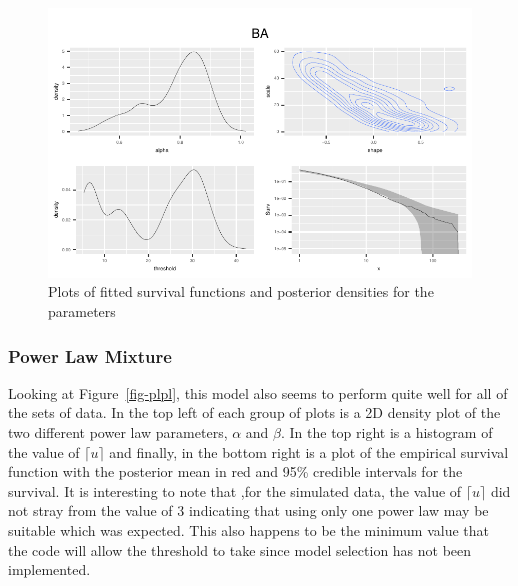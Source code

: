 \documentclass[
]{article}
\begin{document}
\begin{figure}
\begin{minipage}[t]{0.33\linewidth}
{\captionsetup{labelsep=none}\includegraphics{proposal_files/figure-pdf/fig-pli-5.pdf}

}

\subcaption{\label{fig-pli-5}}

\end{minipage}%

\caption{\label{fig-pli}Plots of fitted survival functions and posterior
densities for the parameters}

\end{figure}%

\subsubsection{Power Law Mixture}\label{power-law-mixture}

Looking at Figure~\ref{fig-plpl}, this model also seems to perform quite
well for all of the sets of data. In the top left of each group of plots
is a 2D density plot of the two different power law parameters,
\(\alpha\) and \(\beta\). In the top right is a histogram of the value
of \(\lceil u\rceil\) and finally, in the bottom right is a plot of the
empirical survival function with the posterior mean in red and 95\%
credible intervals for the survival. It is interesting to note that ,for
the simulated data, the value of \(\lceil u \rceil\) did not stray from
the value of 3 indicating that using only one power law may be suitable
which was expected. This also happens to be the minimum value that the
code will allow the threshold to take since model selection has not been
implemented.
\end{document}
